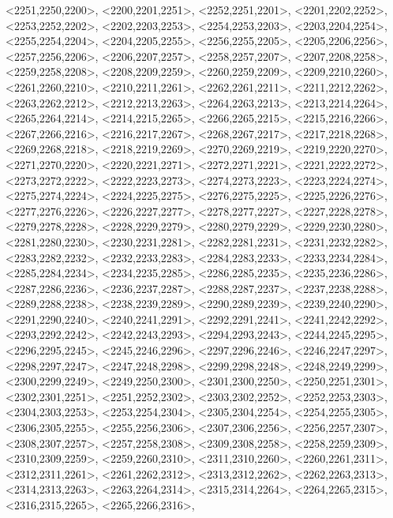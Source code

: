 \documentclass[a4paper,10pt]{article}
\begin{document}
\begin{eulernotebook}
\begin{euleroutput}
  <2251,2250,2200>,
  <2200,2201,2251>,
  <2252,2251,2201>,
  <2201,2202,2252>,
  <2253,2252,2202>,
  <2202,2203,2253>,
  <2254,2253,2203>,
  <2203,2204,2254>,
  <2255,2254,2204>,
  <2204,2205,2255>,
  <2256,2255,2205>,
  <2205,2206,2256>,
  <2257,2256,2206>,
  <2206,2207,2257>,
  <2258,2257,2207>,
  <2207,2208,2258>,
  <2259,2258,2208>,
  <2208,2209,2259>,
  <2260,2259,2209>,
  <2209,2210,2260>,
  <2261,2260,2210>,
  <2210,2211,2261>,
  <2262,2261,2211>,
  <2211,2212,2262>,
  <2263,2262,2212>,
  <2212,2213,2263>,
  <2264,2263,2213>,
  <2213,2214,2264>,
  <2265,2264,2214>,
  <2214,2215,2265>,
  <2266,2265,2215>,
  <2215,2216,2266>,
  <2267,2266,2216>,
  <2216,2217,2267>,
  <2268,2267,2217>,
  <2217,2218,2268>,
  <2269,2268,2218>,
  <2218,2219,2269>,
  <2270,2269,2219>,
  <2219,2220,2270>,
  <2271,2270,2220>,
  <2220,2221,2271>,
  <2272,2271,2221>,
  <2221,2222,2272>,
  <2273,2272,2222>,
  <2222,2223,2273>,
  <2274,2273,2223>,
  <2223,2224,2274>,
  <2275,2274,2224>,
  <2224,2225,2275>,
  <2276,2275,2225>,
  <2225,2226,2276>,
  <2277,2276,2226>,
  <2226,2227,2277>,
  <2278,2277,2227>,
  <2227,2228,2278>,
  <2279,2278,2228>,
  <2228,2229,2279>,
  <2280,2279,2229>,
  <2229,2230,2280>,
  <2281,2280,2230>,
  <2230,2231,2281>,
  <2282,2281,2231>,
  <2231,2232,2282>,
  <2283,2282,2232>,
  <2232,2233,2283>,
  <2284,2283,2233>,
  <2233,2234,2284>,
  <2285,2284,2234>,
  <2234,2235,2285>,
  <2286,2285,2235>,
  <2235,2236,2286>,
  <2287,2286,2236>,
  <2236,2237,2287>,
  <2288,2287,2237>,
  <2237,2238,2288>,
  <2289,2288,2238>,
  <2238,2239,2289>,
  <2290,2289,2239>,
  <2239,2240,2290>,
  <2291,2290,2240>,
  <2240,2241,2291>,
  <2292,2291,2241>,
  <2241,2242,2292>,
  <2293,2292,2242>,
  <2242,2243,2293>,
  <2294,2293,2243>,
  <2244,2245,2295>,
  <2296,2295,2245>,
  <2245,2246,2296>,
  <2297,2296,2246>,
  <2246,2247,2297>,
  <2298,2297,2247>,
  <2247,2248,2298>,
  <2299,2298,2248>,
  <2248,2249,2299>,
  <2300,2299,2249>,
  <2249,2250,2300>,
  <2301,2300,2250>,
  <2250,2251,2301>,
  <2302,2301,2251>,
  <2251,2252,2302>,
  <2303,2302,2252>,
  <2252,2253,2303>,
  <2304,2303,2253>,
  <2253,2254,2304>,
  <2305,2304,2254>,
  <2254,2255,2305>,
  <2306,2305,2255>,
  <2255,2256,2306>,
  <2307,2306,2256>,
  <2256,2257,2307>,
  <2308,2307,2257>,
  <2257,2258,2308>,
  <2309,2308,2258>,
  <2258,2259,2309>,
  <2310,2309,2259>,
  <2259,2260,2310>,
  <2311,2310,2260>,
  <2260,2261,2311>,
  <2312,2311,2261>,
  <2261,2262,2312>,
  <2313,2312,2262>,
  <2262,2263,2313>,
  <2314,2313,2263>,
  <2263,2264,2314>,
  <2315,2314,2264>,
  <2264,2265,2315>,
  <2316,2315,2265>,
  <2265,2266,2316>,

\end{euleroutput}
\end{eulernotebook}
\end{document}
